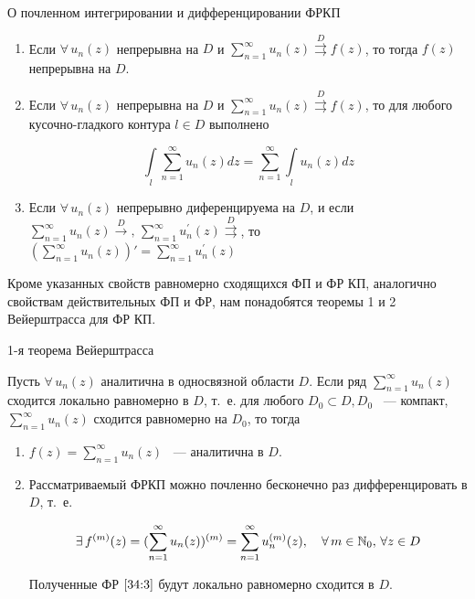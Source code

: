 \documentclass[../../main.tex]{subfiles}
\begin{document}
\begin{thm}{О почленном интегрировании и дифференцировании ФРКП}
	\begin{enumerate}
		\item Если $ \forall\, u_n (z) $ непрерывна на $ D $ и $ \sum\limits_{n = 1}^{\infty} u_n(z) \overset{D}\rightrightarrows f(z) $, то тогда $ f(z) $ непрерывна на $ D $.
		
		\item Если $ \forall\, u_n (z) $ непрерывна на $ D $ и $ \sum\limits_{n = 1}^{\infty} u_n(z) \overset{D}\rightrightarrows f(z) $, то для любого кусочно-гладкого контура $ l \in D $ выполнено
		
		\[ \int\limits_l \sum\limits_{n = 1}^{\infty} u_n(z) dz = \sum\limits_{n = 1}^{\infty} \int\limits_l  u_n(z) dz \]
		
		\item Если $ \forall\, u_n(z) $ непрерывно диференцируема на $ D $, и если $ \sum\limits_{n = 1}^{\infty} u_n(z) \overset{D}{\longrightarrow},\, \sum\limits_{n = 1}^{\infty} u_n^{'}(z) \overset{D}\rightrightarrows $, то $ (\sum\limits_{n = 1}^{\infty} u_n(z))' = \sum\limits_{n = 1}^{\infty} u_n^{'}(z) $
	\end{enumerate}
\end{thm}

Кроме указанных свойств равномерно сходящихся ФП и ФР КП, аналогично свойствам действительных ФП и ФР, нам понадобятся теоремы 1 и 2 Вейерштрасса для ФР КП.

\begin{thm}{1-я теорема Вейерштрасса}
	\;
	
	Пусть $ \forall\, u_n(z) $ аналитична в односвязной области $ D $. Если ряд $ \sum\limits_{n = 1}^{\infty} u_n(z) $ сходится локально равномерно в $ D $, т.~е. для любого $ D_0 \subset D, D_0 $ ~--- компакт, $ \sum\limits_{n = 1}^{\infty} u_n(z) $ сходится равномерно на $ D_0 $, то тогда
	
	\begin{enumerate}
		\item  $ f(z) = \sum\limits_{n = 1}^{\infty} u_n(z) $ ~--- аналитична в $ D $.
		
		\item Рассматриваемый ФРКП можно почленно бесконечно раз дифференцировать в $ D $, т.~е.
		
		\begin{equation}\label{34:3}
			 \exists\, f^{(m)}(z) = (\sum\limits_{n = 1}^{\infty} u_n(z))^{(m)} = \sum\limits_{n = 1}^{\infty} u_n^{(m)} (z), \quad \forall\, m \in \mathbb{N}_0,\, \forall z \in D
		\end{equation}
		
		Полученные ФР $ \eqref{34:3} $ будут локально равномерно сходится в $ D $.
	\end{enumerate}
\end{thm}
\end{document}
